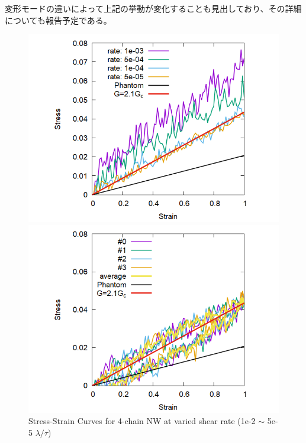 \documentclass[uplatex,dvipdfmx,a4paper,10pt]{jsarticle}
\makeatletter
\def\section{\@startsection {section}{1}{\z@}{1.5 ex plus 2ex minus -.2ex}{0.5 ex plus .2ex}{\large\bf}}
\makeatother
\begin{document}
変形モードの違いによって上記の挙動が変化することも見出しており、その詳細についても報告予定である。




\begin{figure}[hb]
    \begin{minipage}{0.5\hsize}
        \begin{center}
        \includegraphics[width=.7\textwidth]{Shear_Random_4chain_N20.png}
        \caption{Stress-Strain Curves for 4-chain NW at varied shear rate (1e-2 $\sim$ 5e-5 $\lambda/\tau$)}
        \label{fig:deform}
        \end{center}
    \end{minipage}
    \begin{minipage}{0.5\hsize}
        \begin{center}
        \includegraphics[width=.7\textwidth]{CyclicDeform_4chain_rate_2e-4.png}

\end{center}
\end{minipage}
\end{figure}
\end{document}
